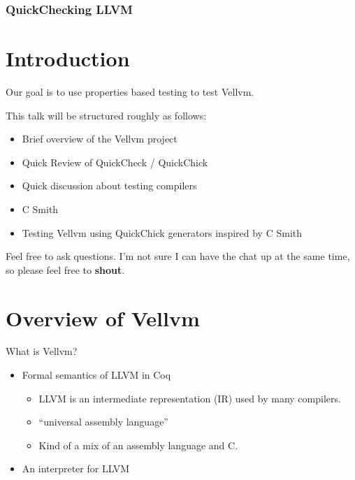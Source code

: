 \documentclass{beamer}
\author{
  Beck, Calvin\\
  \href{mailto:hobbes@seas.upenn.edu}{hobbes@seas.upenn.edu}
  \and\\~\\
  Zakowski, Yannick\\
  \href{mailto:zakowski@seas.upenn.edu}{zakowski@seas.upenn.edu}
}
\begin{document}
\begin{frame}
  \frametitle{QuickChecking LLVM}
  \maketitle
\end{frame}

\section{Introduction}

\begin{frame}

  Our goal is to use properties based testing to test Vellvm.

  This talk will be structured roughly as follows:
  
  \begin{itemize}
  \item Brief overview of the Vellvm project
  \item Quick Review of QuickCheck / QuickChick
  \item Quick discussion about testing compilers
  \item C Smith
  \item Testing Vellvm using QuickChick generators inspired by C Smith
  \end{itemize}

  Feel free to ask questions. I'm not sure I can have the chat up at
  the same time, so please feel free to {\bf shout}.
\end{frame}

\section{Overview of Vellvm}

\begin{frame}
  What is Vellvm?

  \begin{itemize}
  \item Formal semantics of LLVM in Coq
    \begin{itemize}
    \item LLVM is an intermediate representation (IR) used by many
      compilers.
    \item ``universal assembly language''
    \item Kind of a mix of an assembly language and C.
    \end{itemize}
  \item An interpreter for LLVM
  \end{itemize}
\end{frame}
\end{document}
